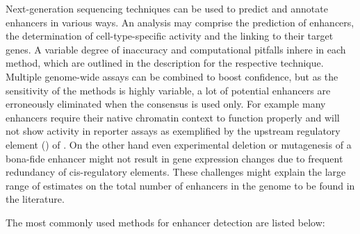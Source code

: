 Next-generation sequencing techniques can be used to predict and annotate enhancers in various ways. An analysis may comprise the prediction of enhancers, the determination of cell-type-specific activity and the linking to their target genes\cite{Lim2018,Ramisch2019}. A variable degree of inaccuracy and computational pitfalls inhere in each method, which are outlined in the description for the respective technique. Multiple genome-wide assays can be combined to boost confidence\cite{Benton2019}, but as the sensitivity of the methods is highly variable, a lot of potential enhancers are erroneously eliminated when the consensus is used only. For example many enhancers require their native chromatin context to function properly\cite{Inoue2016} and will not show activity in reporter assays as exemplified by the upstream regulatory element () of \cite{Li2001,Rosenbauer2004,Rosenbauer2006,Leddin2011}. On the other hand even experimental deletion or mutagenesis of a bona-fide enhancer might not result in gene expression changes due to frequent redundancy of cis-regulatory elements\cite{Osterwalder2018}. These challenges might explain the large range of estimates on the total number of enhancers in the genome to be found in the literature.

The most commonly used methods for enhancer detection are listed below:

